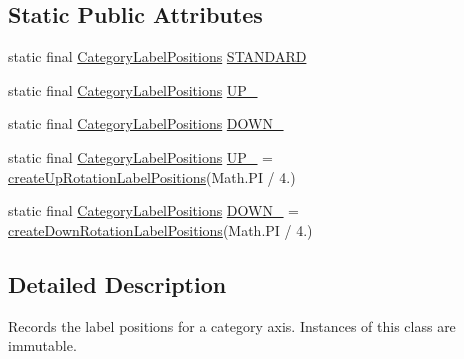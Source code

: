 \subsection*{Static Public Attributes}
\begin{DoxyCompactItemize}
\item 
static final \mbox{\hyperlink{classorg_1_1jfree_1_1chart_1_1axis_1_1_category_label_positions}{Category\+Label\+Positions}} \mbox{\hyperlink{classorg_1_1jfree_1_1chart_1_1axis_1_1_category_label_positions_a4ae6cf55e351213bf7c032df932b35a0}{S\+T\+A\+N\+D\+A\+RD}}
\item 
static final \mbox{\hyperlink{classorg_1_1jfree_1_1chart_1_1axis_1_1_category_label_positions}{Category\+Label\+Positions}} \mbox{\hyperlink{classorg_1_1jfree_1_1chart_1_1axis_1_1_category_label_positions_a309062e5b26c7211a0ff5c9eca8b712b}{U\+P\+\_}}
\item 
static final \mbox{\hyperlink{classorg_1_1jfree_1_1chart_1_1axis_1_1_category_label_positions}{Category\+Label\+Positions}} \mbox{\hyperlink{classorg_1_1jfree_1_1chart_1_1axis_1_1_category_label_positions_a03b972c86dc6de0e65967c208a56b713}{D\+O\+W\+N\+\_}}
\item 
static final \mbox{\hyperlink{classorg_1_1jfree_1_1chart_1_1axis_1_1_category_label_positions}{Category\+Label\+Positions}} \mbox{\hyperlink{classorg_1_1jfree_1_1chart_1_1axis_1_1_category_label_positions_aae5315e3f13f832651b21d062ce97036}{U\+P\+\_}} = \mbox{\hyperlink{classorg_1_1jfree_1_1chart_1_1axis_1_1_category_label_positions_a15845d31a6799d16451089dfac9c9b8b}{create\+Up\+Rotation\+Label\+Positions}}(Math.\+PI / 4.)
\item 
static final \mbox{\hyperlink{classorg_1_1jfree_1_1chart_1_1axis_1_1_category_label_positions}{Category\+Label\+Positions}} \mbox{\hyperlink{classorg_1_1jfree_1_1chart_1_1axis_1_1_category_label_positions_aac24c18c1cac730e7ffc9c5f166569d5}{D\+O\+W\+N\+\_}} = \mbox{\hyperlink{classorg_1_1jfree_1_1chart_1_1axis_1_1_category_label_positions_ad3126abddb79cc121679617abb76aa80}{create\+Down\+Rotation\+Label\+Positions}}(Math.\+PI / 4.)
\end{DoxyCompactItemize}


\subsection{Detailed Description}
Records the label positions for a category axis. Instances of this class are immutable. 

